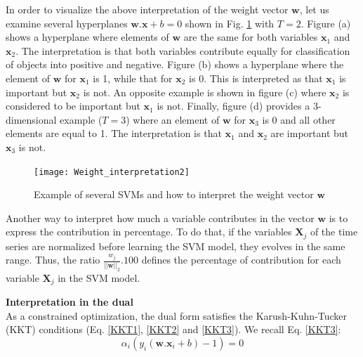 In order to visualize the above interpretation of the weight vector $\textbf{w}$, let us examine several hyperplanes $\textbf{w}.\textbf{x}+b=0$ shown in Fig. \ref*{fig:Weight_interpretation} with $T=2$. Figure (a) shows a hyperplane where elements of $\textbf{w}$ are the same for both variables $\textbf{x}_1$ and $\textbf{x}_2$. The interpretation is that both variables contribute equally for classification of objects into positive and negative. Figure (b) shows a hyperplane where the element of $\textbf{w}$ for $\textbf{x}_1$ is 1, while that for $\textbf{x}_2$ is 0. This is interpreted as that $\textbf{x}_1$ is important but $\textbf{x}_2$ is not. An opposite example is shown in figure (c) where $\textbf{x}_2$ is considered to be important but $\textbf{x}_1$ is not. Finally, figure (d) provides a 3-dimensional example ($T=3$) where an element of $\textbf{w}$ for $\textbf{x}_3$ is 0 and all other elements are equal to 1. The interpretation is that $\textbf{x}_1$ and $\textbf{x}_2$ are important but $\textbf{x}_3$ is not.
\begin{figure}[h!]
	\centering
	\texttt{[image: Weight\_interpretation2]}
	\caption{Example of several SVMs and how to interpret the weight vector $\textbf{w}$}
	\label{fig:Weight_interpretation}
\end{figure}

Another way to interpret how much a variable contributes in the vector $\textbf{w}$ is to express the contribution in percentage. To do that, if the variables $\textbf{X}_j$ of the time series are normalized before learning the SVM model, they evolves in the same range. Thus, the ratio $\frac{w_j}{||\textbf{w}||_2} . 100$ defines the percentage of contribution for each variable $\textbf{X}_j$ in the SVM model.




\noindent \textbf{Interpretation in the dual} \\
As a constrained optimization, the dual form satisfies the
Karush-Kuhn-Tucker (KKT) conditions (Eq. \ref{KKT1}, \ref{KKT2} and \ref{KKT3}). We recall Eq. \ref{KKT3}:
\begin{equation*}
	\alpha_i (y_i(\textbf{w}.\textbf{x}_i+b)-1) = 0
\end{equation*}


